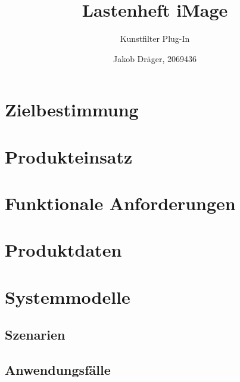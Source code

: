 \documentclass[parskip=full]{scrartcl}
\title{Lastenheft iMage}
\subtitle{Kunstfilter Plug-In}
\author{Jakob Dr\"ager, 2069436}
\begin{document}
\maketitle

\section{Zielbestimmung}
\section{Produkteinsatz}
\section{Funktionale Anforderungen}
\section{Produktdaten}
\section{Systemmodelle}
\subsection{Szenarien}
\subsection{Anwendungsf\"alle}
\end{document}
